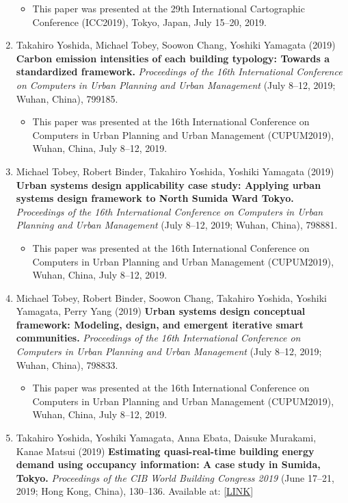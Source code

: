 \documentclass[
]{book}
\providecommand{\tightlist}{%
  \setlength{\itemsep}{0pt}\setlength{\parskip}{0pt}}
\begin{document}
\begin{enumerate}
  \begin{itemize}
  \tightlist
  \item
    This paper was presented at the 29th International Cartographic Conference (ICC2019), Tokyo, Japan, July 15--20, 2019.
  \end{itemize}
\item
  Takahiro Yoshida, Michael Tobey, Soowon Chang, Yoshiki Yamagata (2019)
  \textbf{Carbon emission intensities of each building typology: Towards a standardized framework.}
  \emph{Proceedings of the 16th International Conference on Computers in Urban Planning and Urban Management} (July 8--12, 2019; Wuhan, China), 799185.

  \begin{itemize}
  \tightlist
  \item
    This paper was presented at the 16th International Conference on Computers in Urban Planning and Urban Management (CUPUM2019), Wuhan, China, July 8--12, 2019.
  \end{itemize}
\item
  Michael Tobey, Robert Binder, Takahiro Yoshida, Yoshiki Yamagata (2019)
  \textbf{Urban systems design applicability case study: Applying urban systems design framework to North Sumida Ward Tokyo.}
  \emph{Proceedings of the 16th International Conference on Computers in Urban Planning and Urban Management} (July 8--12, 2019; Wuhan, China), 798881.

  \begin{itemize}
  \tightlist
  \item
    This paper was presented at the 16th International Conference on Computers in Urban Planning and Urban Management (CUPUM2019), Wuhan, China, July 8--12, 2019.
  \end{itemize}
\item
  Michael Tobey, Robert Binder, Soowon Chang, Takahiro Yoshida, Yoshiki Yamagata, Perry Yang (2019)
  \textbf{Urban systems design conceptual framework: Modeling, design, and emergent iterative smart communities.}
  \emph{Proceedings of the 16th International Conference on Computers in Urban Planning and Urban Management} (July 8--12, 2019; Wuhan, China), 798833.

  \begin{itemize}
  \tightlist
  \item
    This paper was presented at the 16th International Conference on Computers in Urban Planning and Urban Management (CUPUM2019), Wuhan, China, July 8--12, 2019.
  \end{itemize}
\item
  Takahiro Yoshida, Yoshiki Yamagata, Anna Ebata, Daisuke Murakami, Kanae Matsui (2019)
  \textbf{Estimating quasi-real-time building energy demand using occupancy information: A case study in Sumida, Tokyo.}
  \emph{Proceedings of the CIB World Building Congress 2019} (June 17--21, 2019; Hong Kong, China), 130--136.
  Available at: {[}\href{https://site.cibworld.nl/dl/publications/WBC19/WBC_Proceedings_June2019_Complete.pdf}{LINK}{]}


\end{enumerate}
\end{document}
